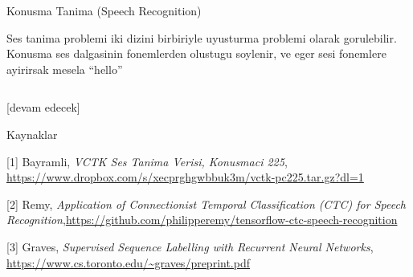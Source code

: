 \documentclass[12pt,fleqn]{article}\usepackage{../../common}
\begin{document}
Konusma Tanima (Speech Recognition)

Ses tanima problemi iki dizini birbiriyle uyusturma problemi olarak
gorulebilir. Konusma ses dalgasinin fonemlerden olustugu soylenir, ve eger
sesi fonemlere ayirirsak mesela ``hello'' 




\inputminted[fontsize=\footnotesize]{python}{train.py}


[devam edecek]

Kaynaklar

[1] Bayramli, {\em VCTK Ses Tanima Verisi, Konusmaci 225}, \url{https://www.dropbox.com/s/xecprghgwbbuk3m/vctk-pc225.tar.gz?dl=1}

[2] Remy, {\em Application of Connectionist Temporal Classification (CTC) for Speech Recognition},\url{https://github.com/philipperemy/tensorflow-ctc-speech-recognition}

[3] Graves, {\em Supervised Sequence Labelling with Recurrent Neural Networks}, \url{https://www.cs.toronto.edu/~graves/preprint.pdf}
\end{document}

